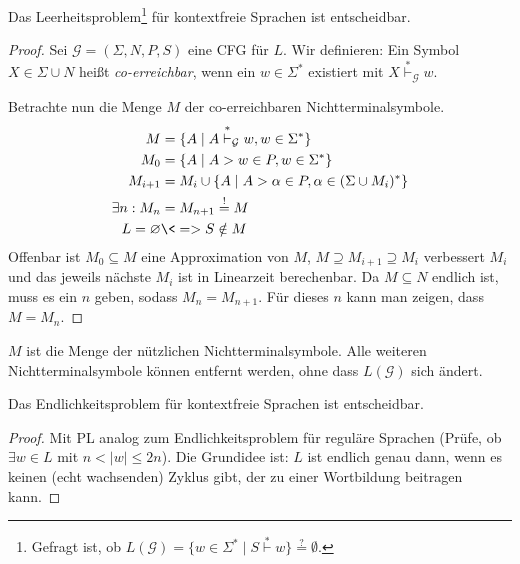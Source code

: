 \begin{Satz}[name={[Entscheidbarkeit des Leerheitsproblems für kontextfreie Sprachen]}] %
  \label{thm:cfl-decidable-emptyness}
    Das Leerheitsproblem\footnote{Gefragt ist, ob $L(\mathcal{G}) = \{ w\in\Sigma^* \mid S\overset{*}{\vdash} w \} \overset{?}{=} \emptyset
$.} für kontextfreie Sprachen ist entscheidbar.
\end{Satz}

\begin{proof}
    Sei $\mathcal{G} = (\Sigma, N, P, S)$ eine \ac{CFG} für $L$.
    Wir definieren:
    Ein Symbol $X \in \Sigma \cup N$ heißt \emph{co-erreichbar}, wenn ein $w \in \Sigma^*$ existiert mit $X \stackrel{*}{\vdash}_\mathcal{G} w$.
     
    Betrachte nun die Menge $M$ der co-erreichbaren Nichtterminalsymbole.
	\begin{align*}
		M &= \{ A \mid A \stackrel{*}{\vdash}_\mathcal{G} w, w\in \Sigma^* \}\\
		M_0 &= \{ A \mid A \-> w\in P, w\in \Sigma^* \}\\
		M_{i+1} &= M_i\cup \{ A \mid A \-> \alpha\in P, \alpha\in(\Sigma\cup M_i)^* \}\\
		\exists n : M_n &= M_{n+1} \overset!= M\\
		L =\varnothing &\<=> S\notin M \qedhere
	\end{align*}
	Offenbar ist $M_0 \subseteq M$ eine Approximation von $M$, $M \supseteq M_{i+1} \supseteq M_i$ verbessert $M_i$ und das jeweils nächste $M_i$ ist in Linearzeit berechenbar. Da $M \subseteq N$ endlich ist, muss es ein $n$ geben, sodass $M_n = M_{n+1}$. Für dieses $n$ kann man zeigen, dass $M = M_n$. 
\end{proof}
\begin{Bem}
	$M$ ist die Menge der nützlichen Nichtterminalsymbole. Alle weiteren Nichtterminalsymbole können entfernt werden, ohne dass $L(\mathcal{G})$ sich ändert.
\end{Bem}
\begin{Satz}[name={[Entscheidbarkeit des Endlichkeitsproblem für \acs*{CFL}]}]
	Das Endlichkeitsproblem für kontextfreie Sprachen ist entscheidbar.
\end{Satz}
\begin{proof}
	Mit \ac{PL} analog zum Endlichkeitsproblem für reguläre Sprachen (Prüfe, ob $\exists w \in L$ mit $n < |w| \le 2n$).
	Die Grundidee ist: $L$ ist endlich genau dann, wenn es keinen (echt wachsenden) Zyklus gibt, der zu einer Wortbildung beitragen kann.
\end{proof}



